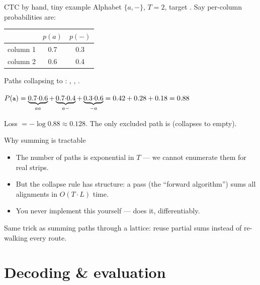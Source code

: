 \documentclass[10pt,aspectratio=169]{beamer}
\begin{document}
\begin{frame}{CTC by hand, tiny example}
  Alphabet $\{a,-\}$, $T{=}2$, target . Say per-column probabilities are:
  \begin{center}
  \begin{tabular}{@{}lcc@{}}
    \toprule
     & $p(a)$ & $p(-)$ \\
    \midrule
    column 1 & 0.7 & 0.3 \\
    column 2 & 0.6 & 0.4 \\
    \bottomrule
  \end{tabular}
  \end{center}
  Paths collapsing to : , , .
  \begin{mathbox}
    $P(\text{\code{a}}) = \underbrace{0.7{\cdot}0.6}_{aa}+\underbrace{0.7{\cdot}0.4}_{a-}+\underbrace{0.3{\cdot}0.6}_{-a}
    = 0.42+0.28+0.18 = 0.88$
  \end{mathbox}
  Loss $= -\log 0.88 \approx 0.128$. The only excluded path is \code{-\,-} (collapses to empty).
\end{frame}

\begin{frame}{Why summing is tractable}
  \begin{itemize}
    \item The number of paths is exponential in $T$ --- we cannot enumerate them for real strips.
    \item But the collapse rule has structure: a  pass (the ``forward algorithm'')
          sums all alignments in $O(T\cdot L)$ time.
    \item You never implement this yourself ---  does it, differentiably.
  \end{itemize}
  \begin{goodbox}
    Same trick as summing paths through a lattice: reuse partial sums instead of re-walking every route.
  \end{goodbox}
\end{frame}

\section{Decoding \& evaluation}
\end{document}

